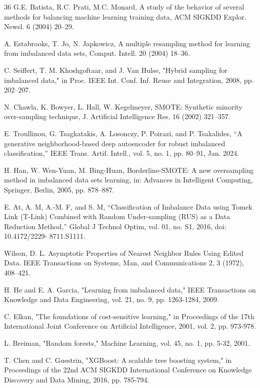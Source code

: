 \documentclass[sigconf]{acmart}
\begin{document}
\begin{thebibliography}{36}
 G.E. Batista, R.C. Prati, M.C. Monard, A study of the behavior of several methods for balancing machine learning training data, ACM SIGKDD Explor. Newsl. 6 (2004) 20–29.

 A. Estabrooks, T. Jo, N. Japkowicz, A multiple resampling method for learning from imbalanced data sets, Comput. Intell. 20 (2004) 18–36.

 C. Seiffert, T. M. Khoshgoftaar, and J. Van Hulse, "Hybrid sampling for imbalanced data," in Proc. IEEE Int. Conf. Inf. Reuse and Integration, 2008, pp. 202–207.

 N. Chawla, K. Bowyer, L. Hall, W. Kegelmeyer, SMOTE: Synthetic minority over-sampling technique, J. Artificial Intelligence Res. 16 (2002) 321–357.

 E. Troullinou, G. Tsagkatakis, A. Losonczy, P. Poirazi, and P. Tsakalides, “A generative neighborhood-based deep autoencoder for robust imbalanced classification,” IEEE Trans. Artif. Intell., vol. 5, no. 1, pp. 80–91, Jan. 2024.

 H. Han, W. Wen-Yuan, M. Bing-Huan, Borderline-SMOTE: A new oversampling method in imbalanced data sets learning, in: Advances in Intelligent Computing, Springer, Berlin, 2005, pp. 878–887.

 E. At, A. M, A.-M. F, and S. M, “Classification of Imbalance Data using Tomek Link (T-Link) Combined with Random Under-sampling (RUS) as a Data Reduction Method,” Global J Technol Optim, vol. 01, no. S1, 2016, doi: 10.4172/2229- 8711.S1111.

 Wilson, D. L. Asymptotic Properties of Nearest Neighbor Rules Using Edited Data. IEEE Transactions on Systems, Man, and Communications 2, 3 (1972), 408–421.

 H. He and E. A. Garcia, "Learning from imbalanced data," IEEE Transactions on Knowledge and Data Engineering, vol. 21, no. 9, pp. 1263-1284, 2009.

 C. Elkan, "The foundations of cost-sensitive learning," in Proceedings of the 17th International Joint Conference on Artificial Intelligence, 2001, vol. 2, pp. 973-978.

 L. Breiman, "Random forests," Machine Learning, vol. 45, no. 1, pp. 5-32, 2001.

 T. Chen and C. Guestrin, "XGBoost: A scalable tree boosting system," in Proceedings of the 22nd ACM SIGKDD International Conference on Knowledge Discovery and Data Mining, 2016, pp. 785-794.


\end{thebibliography}
\end{document}
